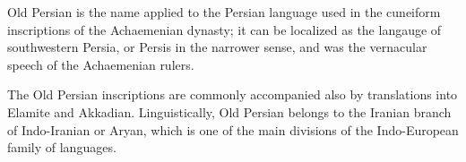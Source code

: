



    Old Persian is the name applied to the Persian language used in the cuneiform inscriptions of the Achaemenian dynasty; it can be localized as the langauge of southwestern Persia, or Persis in the narrower sense, and was the vernacular speech of the Achaemenian rulers.

    The Old Persian inscriptions are commonly accompanied also by translations into Elamite and Akkadian. Linguistically, Old Persian belongs to the Iranian branch of Indo-Iranian or Aryan, which is one of the main divisions of the Indo-European family of languages.

    
    
    

    
    \nocite{*}
    



